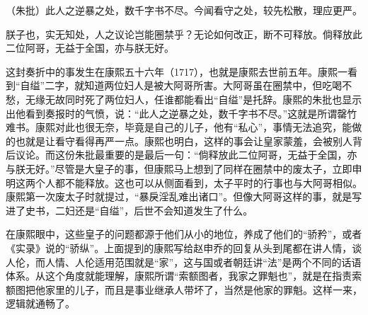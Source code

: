 
\begin{bookquote}（朱批）此人之逆暴之处，数千字书不尽。今闻看守之处，较先松散，理应更严。\end{bookquote}


\begin{bookquote}朕子也，实无知处，人之议论岂能圈禁乎？无论如何改正，断不可释放。倘释放此二位阿哥，无益于全国，亦与朕无好。\end{bookquote}


这封奏折中的事发生在康熙五十六年（1717），也就是康熙去世前五年。康熙一看到“自缢”二字，就知道两位妇人是被大阿哥所害。大阿哥虽在圈禁中，但吃喝不愁，无缘无故同时死了两位妇人，任谁都能看出“自缢”是托辞。康熙的朱批也显示出他看到奏报时的气愤，说：“此人之逆暴之处，数千字书不尽。”这就是所谓罄竹难书。康熙对此也很无奈，毕竟是自己的儿子，他有“私心”，事情无法追究，能做的也就是让看守看得再严一点。康熙也明白，这样的事会让皇家蒙羞，会被别人背后议论。而这份朱批最重要的是最后一句：“倘释放此二位阿哥，无益于全国，亦与朕无好。”尽管是大皇子的事，但康熙马上想到了同样在圈禁中的废太子，立即申明这两个人都不能释放。这也可以从侧面看到，太子平时的行事也与大阿哥相似。康熙第一次废太子时就提过，“暴戾淫乱难出诸口”。但像大阿哥这样的事，就是写进了史书，二妇还是“自缢”，后世不会知道发生了什么。



在康熙眼中，这些皇子的问题都源于他们从小的地位，养成了他们的“骄矜”，或者《实录》说的“骄纵”。上面提到的康熙写给赵申乔的回复从头到尾都在讲人情，谈人伦，而人情、人伦适用范围就是“家”，这与国或者朝廷讲“法”是两个不同的话语体系。从这个角度就能理解，康熙所谓“索额图者，我家之罪魁也”，就是在指责索额图把他家里的儿子，而且是事业继承人带坏了，当然是他家的罪魁。这样一来，逻辑就通畅了。


